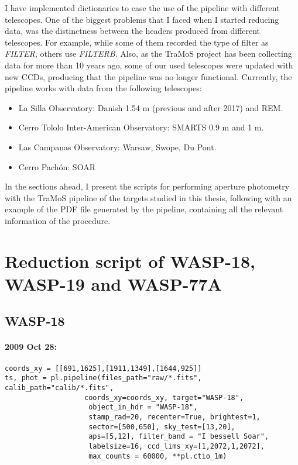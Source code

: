 I have implemented dictionaries to ease the use of the pipeline with different telescopes. One of the biggest problems that I faced when I started reducing data, was the distinctness between the headers produced from different telescopes. For example, while some of them recorded the type of filter as \textit{FILTER}, others use \textit{FILTERB}. Also, as the TraMoS project has been collecting data for more than 10 years ago, some of our used telescopes were updated with new CCDs, producing that the pipeline was no longer functional. Currently, the pipeline works with data from the following telescopes: 
\begin{itemize}
\item La Silla Observatory: Danish 1.54 m (previous and after 2017) and REM.
\item Cerro Tololo Inter-American Observatory: SMARTS 0.9 m and 1 m.
\item Las Campanas Observatory: Warsaw, Swope, Du Pont.
\item Cerro Pachón: SOAR
\end{itemize}

In the sections ahead, I present the scripts for performing aperture photometry with the TraMoS pipeline of the targets studied in this thesis, following with an example of the PDF file generated by the pipeline, containing all the relevant information of the procedure.

\section{Reduction script of WASP-18, WASP-19 and WASP-77A}
\subsection*{WASP-18}
\paragraph*{2009 Oct 28:}
\begin{verbatim}
coords_xy = [[691,1625],[1911,1349],[1644,925]]
ts, phot = pl.pipeline(files_path="raw/*.fits", calib_path="calib/*.fits", 
				   coords_xy=coords_xy, target="WASP-18",
                    object_in_hdr = "WASP-18",
                    stamp_rad=20, recenter=True, brightest=1,
                    sector=[500,650], sky_test=[13,20],
                    aps=[5,12], filter_band = "I bessell Soar",
                    labelsize=16, ccd_lims_xy=[1,2072,1,2072],
                    max_counts = 60000, **pl.ctio_1m)
\end{verbatim}


